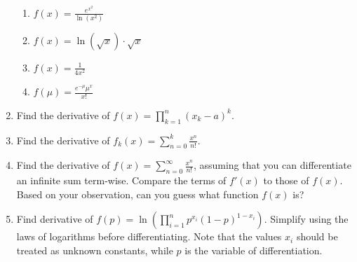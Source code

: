\documentclass{article}
\begin{document}
\begin{enumerate}
\begin{enumerate}
                    \item $\displaystyle f(x) = \frac{e^{x^2}}{\ln(x^2)}$
                    \item $\displaystyle f(x) = \ln(\sqrt{x})\cdot \sqrt{x}$
                    \item $\displaystyle f(x) = \frac{1}{4x^2}$
                    \item $\displaystyle f(\mu) = \frac{e^{-\mu}\mu^x}{x!}$
                \end{enumerate}
                \item Find the derivative of $\displaystyle f(x)=\prod_{k=1}^n (x_k-a)^k$. 
                \item Find the derivative of $\displaystyle f_k(x) = \sum_{n=0}^k \frac{x^n}{n!}$.
                \item Find the derivative of $\displaystyle f(x) = \sum_{n=0}^\infty \frac{x^n}{n!}$, assuming that you can differentiate an infinite sum term-wise. Compare the terms of $f'(x)$ to those of $f(x)$. Based on your observation, can you guess what function $f(x)$ is?
                \item Find derivative of $\displaystyle f(p) = \ln{\left(\prod_{i=1}^n p^{x_i}(1-p)^{1-x_i}\right)}$. Simplify using the laws of logarithms before differentiating. Note that the values $x_i$ should be treated as unknown constants, while $p$ is the variable of differentiation.
          
                
           
                \end{enumerate}
\end{document}

